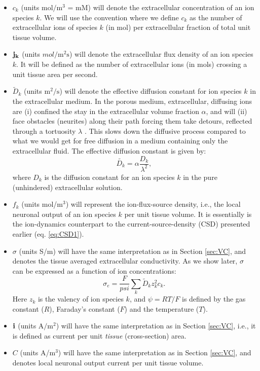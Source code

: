 \begin{itemize}
\item $c_k$ (units $\mathrm{mol/m^3}$ = mM) will denote the extracellular concentration of an ion species $k$. We will use the convention where we define $c_k$ as the number of extracellular ions of species $k$ (in mol) per extracellular fraction of total unit tissue volume. 

\item ${\bf j_k}$ (units $mol/\mathrm{m^2s}$) will denote the extracellular flux density of an ion species $k$. It will be defined as the number of extracellular ions (in mols) crossing a unit tissue area per second. 

\item $\tilde{D}_k$ (units $\mathrm{m^2/s}$) will denote the effective diffusion constant for ion species $k$ in the extracellular medium. In the porous medium, extracellular, diffusing ions are (i) confined the stay in the extracellular volume fraction $\alpha$, and will (ii) face obstacles (neurites) along their path forcing them take detours, reflected through a tortuosity $\lambda$ \citep{Nicholson1998}. This slows down the diffusive process compared to what we would get for free diffusion in a medium containing only the extracellular fluid. The effective diffusion constant is given by:
\begin{equation}
\tilde{D_k} = \alpha \frac{D_k}{\lambda^2}, 
\label{eq:diffconst}
\end{equation}
where $D_k$ is the diffusion constant for an ion species $k$ in the pure (unhindered) extracellular solution.

\item $f_k$ (units mol/m$^3$) will represent the ion-flux-source density, i.e., the local neuronal output of an ion species $k$ per unit tissue volume. It is essentially is the ion-dynamics counterpart to the current-source-density (CSD) presented earlier (eq. \ref{eq:CSD1}).

\item $\sigma$ (units S/m) will have the same interpretation as in Section \ref{sec:VC}, and denotes the tissue averaged extracellular conductivity. As we show later, $\sigma$ can be expressed as a function of ion concentrations:
\begin{equation}
\sigma_e = \frac{F}{psi}\sum_{k} \tilde{D}_k z_{k}^2 c_{k}.
\label{eq:sigma1}
\end{equation}
Here $z_{k}$ is the valency of ion species $k$, and $\psi=RT/F$ is defined by the gas constant ($R$), Faraday's constant ($F$) and the temperature ($T$).

\item  ${\bf i}$ (units $\mathrm{A/m^2}$) will have the same interpretation as in Section \ref{sec:VC}, i.e., it is defined as current per unit \textit{tissue} (cross-section) area.

\item $C$ (units A/m$^3$) will have the same interpretation as in Section \ref{sec:VC}, and denotes local neuronal output current per unit tissue volume.

\end{itemize}

